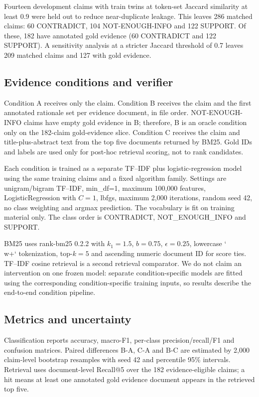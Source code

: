 \documentclass[10pt]{article}
\begin{document}
Fourteen development claims with train twins at token-set Jaccard similarity at least 0.9 were held out to reduce near-duplicate leakage. This leaves 286 matched claims: 60 CONTRADICT, 104 NOT-ENOUGH-INFO and 122 SUPPORT. Of these, 182 have annotated gold evidence (60 CONTRADICT and 122 SUPPORT). A sensitivity analysis at a stricter Jaccard threshold of 0.7 leaves 209 matched claims and 127 with gold evidence.

\subsection{Evidence conditions and verifier}
Condition A receives only the claim. Condition B receives the claim and the first annotated rationale set per evidence document, in file order. NOT-ENOUGH-INFO claims have empty gold evidence in B; therefore, B is an oracle condition only on the 182-claim gold-evidence slice. Condition C receives the claim and title-plus-abstract text from the top five documents returned by BM25. Gold IDs and labels are used only for post-hoc retrieval scoring, not to rank candidates.

Each condition is trained as a separate TF--IDF plus logistic-regression model using the same training claims and a fixed algorithm family. Settings are unigram/bigram TF--IDF, min\_df=1, maximum 100,000 features, LogisticRegression with $C=1$, lbfgs, maximum 2,000 iterations, random seed 42, no class weighting and argmax prediction. The vocabulary is fit on training material only. The class order is CONTRADICT, NOT\_ENOUGH\_INFO and SUPPORT.

BM25 uses rank-bm25 0.2.2 with $k_1=1.5$, $b=0.75$, $\epsilon=0.25$, lowercase `\\w+` tokenization, top-$k=5$ and ascending numeric document ID for score ties. TF--IDF cosine retrieval is a second retrieval comparator. We do not claim an intervention on one frozen model: separate condition-specific models are fitted using the corresponding condition-specific training inputs, so results describe the end-to-end condition pipeline.

\subsection{Metrics and uncertainty}
Classification reports accuracy, macro-F1, per-class precision/recall/F1 and confusion matrices. Paired differences B-A, C-A and B-C are estimated by 2,000 claim-level bootstrap resamples with seed 42 and percentile 95\% intervals. Retrieval uses document-level Recall@5 over the 182 evidence-eligible claims; a hit means at least one annotated gold evidence document appears in the retrieved top five.
\end{document}
